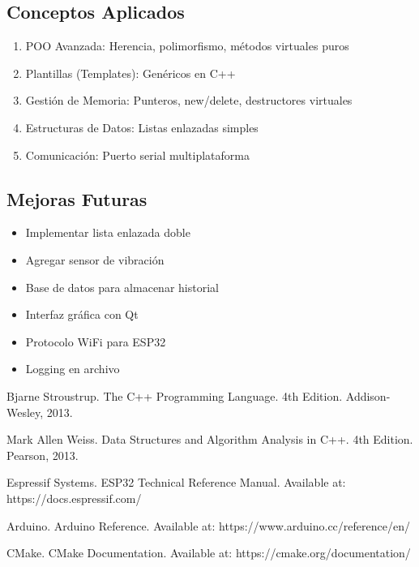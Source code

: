 \documentclass[12pt, spanish]{article}
\begin{document}
\subsection{Conceptos Aplicados}

\begin{enumerate}
    \item POO Avanzada: Herencia, polimorfismo, métodos virtuales puros
    \item Plantillas (Templates): Genéricos en C++
    \item Gestión de Memoria: Punteros, new/delete, destructores virtuales
    \item Estructuras de Datos: Listas enlazadas simples
    \item Comunicación: Puerto serial multiplataforma
\end{enumerate}

\subsection{Mejoras Futuras}

\begin{itemize}
    \item Implementar lista enlazada doble
    \item Agregar sensor de vibración
    \item Base de datos para almacenar historial
    \item Interfaz gráfica con Qt
    \item Protocolo WiFi para ESP32
    \item Logging en archivo
\end{itemize}

\begin{thebibliography}{9}

Bjarne Stroustrup. The C++ Programming Language. 4th Edition. Addison-Wesley, 2013.

Mark Allen Weiss. Data Structures and Algorithm Analysis in C++. 4th Edition. Pearson, 2013.

Espressif Systems. ESP32 Technical Reference Manual. Available at: https://docs.espressif.com/

Arduino. Arduino Reference. Available at: https://www.arduino.cc/reference/en/

CMake. CMake Documentation. Available at: https://cmake.org/documentation/

\end{thebibliography}
\end{document}

